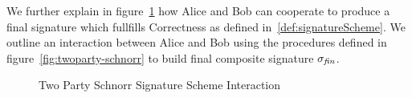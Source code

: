 We further explain in figure~\ref{fig:twoparty-schnorr-prot} how Alice and Bob can cooperate to produce a final signature which fullfills Correctness as defined in~\ref{def:signatureScheme}.
We outline an interaction between Alice and Bob using the procedures defined in figure~\ref{fig:twoparty-schnorr} to build final composite signature $\sigma_{\mathit{fin}}$.

\begin{figure}\label{fig:twoparty-schnorr-prot}
    \centering
    \caption{Two Party Schnorr Signature Scheme Interaction}
\end{figure}

